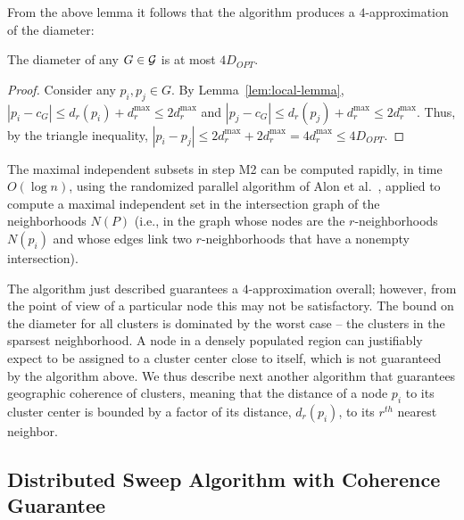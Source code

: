 From the above lemma it follows that the algorithm produces a $4$-approximation of the diameter:

\begin{corollary}
The diameter of any $G\in \mathcal{G}$ is at most $4D_{OPT}$.
\end{corollary}
\begin{proof}
Consider any $p_i,p_j\in G$.  By Lemma~\ref{lem:local-lemma}, 
$|p_i-c_G|\leq d_r(p_i)+d_r^{\max}\leq 2d_r^{\max}$ and
$|p_j-c_G|\leq d_r(p_j)+d_r^{\max}\leq 2d_r^{\max}$.
Thus, by the triangle inequality, $|p_i-p_j|\leq 2d_r^{\max} + 2d_r^{\max} = 4d_r^{\max} \leq 4D_{OPT}$. 
\end{proof}

The maximal independent subsets in step M2 can be computed rapidly, in time $O(\log n)$, using the randomized parallel algorithm of Alon et al.~\cite{alon1986fast}, applied to compute a maximal independent set in the intersection graph of the neighborhoods $N(P)$ (i.e., in the graph whose nodes are the $r$-neighborhoods $N(p_{i})$ and whose edges link two $r$-neighborhoods that have a nonempty intersection).


The algorithm just described guarantees a $4$-approximation overall; however, from the point of view of a particular node this may not be satisfactory. The bound on the diameter for all clusters is dominated by the worst case -- the clusters in the sparsest neighborhood. A node in a densely populated region can justifiably expect to be assigned to a cluster center close to itself, which is not guaranteed by the algorithm above. We thus describe next another algorithm that guarantees geographic coherence of clusters, meaning that the distance of a node $p_{i}$ to its cluster center is bounded by a factor of its distance, $d_{r}(p_{i})$, to its $r^{th}$ nearest neighbor. 

\subsection{Distributed Sweep Algorithm with Coherence Guarantee}

